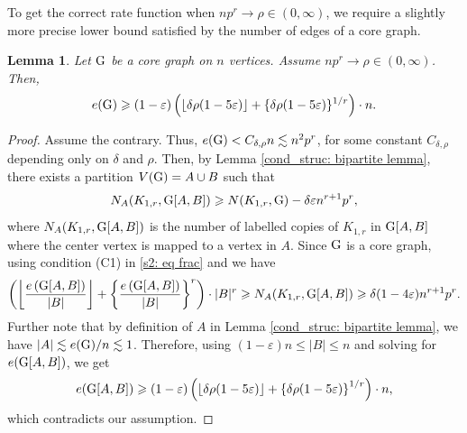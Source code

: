 \documentclass[a4paper,11pt,english,reqno]{amsart}
\numberwithin{equation}{section}
\renewcommand{\leq}{\leqslant}
\renewcommand{\geq}{\geqslant}
\newcommand{\tu}[1]{\textup{#1}}
\newtheorem{lemma}[theorem]{Lemma}
\begin{document}
		
		To get the correct rate function when $np^{r}\rightarrow \rho\in (0,\infty)$, we require a slightly more precise lower bound satisfied by the number of edges of a core graph. 
		\begin{lemma}
			\label{s2: improved geb }
			Let $\tu{G}$ be a core graph on $n$ vertices. Assume $np^{r}\rightarrow \rho\in (0,\infty)$. Then,
			\begin{equation*}
				e(\tu{G})\geq (1-\varepsilon)\left(\lfloor\delta\rho(1-5\varepsilon)\rfloor + \{\delta\rho(1-5\varepsilon)\}^{1/r}\right) \cdot n.
			\end{equation*}
		\end{lemma}
		\begin{proof}
			Assume the contrary. Thus, $e(\tu{G})< C_{\delta, \rho} n \lesssim n^{2}p^{r}$, %
			for some constant $C_{\delta, \rho}$ depending only on $\delta$ and $\rho$. Then, by 
			Lemma \ref{cond_struc: bipartite lemma}, there exists a partition $V(\tu{G})= A\cup B$ such that  
			\begin{equation}
				\label{s2: eq frac}
				N_{A}(K_{1,r}, \tu{G}[A,B])\geq N(K_{1,r}, \tu{G})-\delta\varepsilon n^{r+1}p^{r},
			\end{equation}
			where 
			$N_{A}(K_{1,r}, \tu{G}[A,B])$ is the number of labelled copies of $K_{1,r}$ in $\tu{G}[A,B]$ where the center vertex is mapped to a vertex in $A$. 
			Since $\tu{G}$ is a core graph, using condition (C1) in \eqref{s2: eq frac} and {\cite[Lemma~5.14(i)]{HMS}} we have
			\begin{equation*}
				\left(\left \lfloor\frac{e\left(\tu{G}[A,B]\right)}{|B|}\right\rfloor +\left \{\frac{e\left(\tu{G}[A,B]\right)}{|B|}\right\}^{r}\right)\cdot  |B|^{r} \geq  N_{A}(K_{1,r},\tu{G}[A,B] )\geq \delta(1-4\varepsilon)n^{r+1}p^{r}.
			\end{equation*}
			Further note that by definition of $A$ in Lemma \ref{cond_struc: bipartite lemma}, we have $|A|\lesssim e(\tu{G})/n  \lesssim 1$. Therefore, using $(1-\varepsilon)n \leq |B|\leq n$ and solving for $e(\tu{G}[A,B])$, we get
			\begin{equation*}
				e(\tu{G}[A,B])\geq (1-\varepsilon)\left(\left\lfloor\delta\rho(1-5\varepsilon)\right\rfloor + \left\{\delta\rho(1-5\varepsilon)\right\}^{1/r}\right)\cdot n,
			\end{equation*}
			which contradicts our assumption.
		\end{proof}
		
\end{document}
